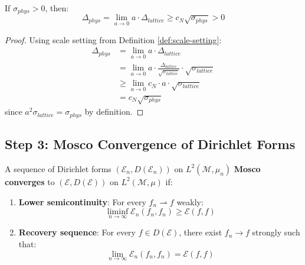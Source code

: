 \begin{corollary}
\label{cor:physical-gap-app114_roadmap_continuum_limit}
If $\sigma_{phys} > 0$, then:
\begin{equation}
\Delta_{phys} = \lim_{a \to 0} a \cdot \Delta_{lattice} \geq c_N \sqrt{\sigma_{phys}} > 0
\end{equation}
\end{corollary}

\begin{proof}
Using scale setting from Definition \ref{def:scale-setting}:
\begin{align}
\Delta_{phys} &= \lim_{a \to 0} a \cdot \Delta_{lattice} \\
&= \lim_{a \to 0} a \cdot \frac{\Delta_{lattice}}{\sqrt{\sigma_{lattice}}} \cdot \sqrt{\sigma_{lattice}} \\
&\geq \lim_{a \to 0} c_N \cdot a \cdot \sqrt{\sigma_{lattice}} \\
&= c_N \sqrt{\sigma_{phys}}
\end{align}
since $a^2 \sigma_{lattice} = \sigma_{phys}$ by definition.
\end{proof}

\subsection{Step 3: Mosco Convergence of Dirichlet Forms}

\begin{definition}
\label{def:mosco-app114_roadmap_continuum_limit}
A sequence of Dirichlet forms $(\mathcal{E}_n, D(\mathcal{E}_n))$ on 
$L^2(\mathcal{M}, \mu_n)$ \textbf{Mosco converges} to $(\mathcal{E}, D(\mathcal{E}))$ 
on $L^2(\mathcal{M}, \mu)$ if:
\begin{enumerate}
\item \textbf{Lower semicontinuity}: For every $f_n \rightharpoonup f$ weakly:
\begin{equation}
\liminf_{n \to \infty} \mathcal{E}_n(f_n, f_n) \geq \mathcal{E}(f, f)
\end{equation}

\item \textbf{Recovery sequence}: For every $f \in D(\mathcal{E})$, there exist 
$f_n \to f$ strongly such that:
\begin{equation}
\lim_{n \to \infty} \mathcal{E}_n(f_n, f_n) = \mathcal{E}(f, f)
\end{equation}
\end{enumerate}
\end{definition}

